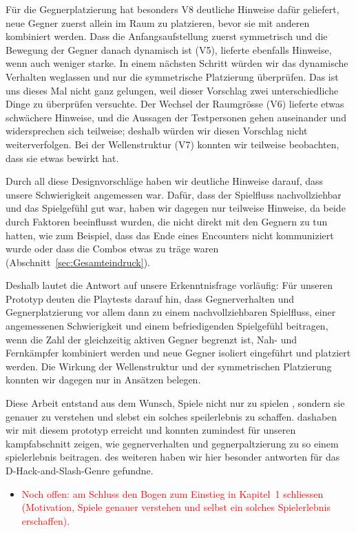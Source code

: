 \documentclass[../Main.tex]{subfiles}
\begin{document}
Für die Gegnerplatzierung hat besonders V8 deutliche Hinweise dafür geliefert, neue Gegner zuerst allein im Raum zu platzieren, bevor sie mit anderen kombiniert werden. Dass die Anfangsaufstellung zuerst symmetrisch und die Bewegung der Gegner danach dynamisch ist (V5), lieferte ebenfalls Hinweise, wenn auch weniger starke. In einem nächsten Schritt würden wir das dynamische Verhalten weglassen und nur die symmetrische Platzierung überprüfen. Das ist uns dieses Mal nicht ganz gelungen, weil dieser Vorschlag zwei unterschiedliche Dinge zu überprüfen versuchte. Der Wechsel der Raumgrösse (V6) lieferte etwas schwächere Hinweise, und die Aussagen der Testpersonen gehen auseinander und widersprechen sich teilweise; deshalb würden wir diesen Vorschlag nicht weiterverfolgen. Bei der Wellenstruktur (V7) konnten wir teilweise beobachten, dass sie etwas bewirkt hat.

Durch all diese Designvorschläge haben wir deutliche Hinweise darauf, dass unsere Schwierigkeit angemessen war. Dafür, dass der Spielfluss nachvollziehbar und das Spielgefühl gut war, haben wir dagegen nur teilweise Hinweise, da beide durch Faktoren beeinflusst wurden, die nicht direkt mit den Gegnern zu tun hatten, wie zum Beispiel, dass das Ende eines Encounters nicht kommuniziert wurde oder dass die Combos etwas zu träge waren (Abschnitt~\ref{sec:Gesamteindruck}).

Deshalb lautet die Antwort auf unsere Erkenntnisfrage vorläufig: Für unseren Prototyp deuten die Playtests darauf hin, dass Gegnerverhalten und Gegnerplatzierung vor allem dann zu einem nachvollziehbaren Spielfluss, einer angemessenen Schwierigkeit und einem befriedigenden Spielgefühl beitragen, wenn die Zahl der gleichzeitig aktiven Gegner begrenzt ist, Nah- und Fernkämpfer kombiniert werden und neue Gegner isoliert eingeführt und platziert werden. Die Wirkung der Wellenstruktur und der symmetrischen Platzierung konnten wir dagegen nur in Ansätzen belegen.

Diese Arbeit entstand aus dem Wunsch, Spiele nicht nur zu spielen , sondern sie genauer zu verstehen und slebst ein solches speilerlebnis zu schaffen. dashaben wir mit diesem prototyp erreicht und konnten zumindest für unseren kampfabschnitt zeigen, wie gegnerverhalten und gegnerpaltzierung zu so einem spielerlebnis beitragen. des weiteren haben wir hier besonder antworten für das D-Hack-and-Slash-Genre gefundne.

\begin{itemize}[leftmargin=1.5cm]
    \item \textcolor{red}{Noch offen: am Schluss den Bogen zum Einstieg in Kapitel~1 schliessen (Motivation, Spiele genauer verstehen und selbst ein solches Spielerlebnis erschaffen).}
\end{itemize}
\end{document}
